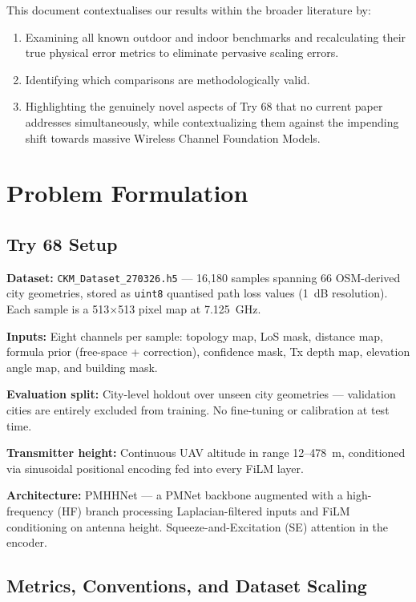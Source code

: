 \documentclass[11pt,a4paper]{article}
\begin{document}
This document contextualises our results within the broader literature by:
\begin{enumerate}[nosep]
    \item Examining all known outdoor and indoor benchmarks and recalculating their true physical error metrics to eliminate pervasive scaling errors.
    \item Identifying which comparisons are methodologically valid.
    \item Highlighting the genuinely novel aspects of Try 68 that no current paper addresses simultaneously, while contextualizing them against the impending shift towards massive Wireless Channel Foundation Models.
\end{enumerate}

\section{Problem Formulation}
\label{sec:problem}

\subsection{Try 68 Setup}

\textbf{Dataset:} \texttt{CKM\_Dataset\_270326.h5} — 16,180 samples spanning 66
OSM-derived city geometries, stored as \texttt{uint8} quantised path loss values (1~dB
resolution). Each sample is a 513$\times$513 pixel map at 7.125~GHz.

\textbf{Inputs:} Eight channels per sample: topology map, LoS mask, distance map,
formula prior (free-space + correction), confidence mask, Tx depth map, elevation
angle map, and building mask.

\textbf{Evaluation split:} City-level holdout over unseen city geometries —
validation cities are entirely excluded from training. No fine-tuning or
calibration at test time.

\textbf{Transmitter height:} Continuous UAV altitude in range 12--478~m, conditioned
via sinusoidal positional encoding fed into every FiLM layer.

\textbf{Architecture:} PMHHNet — a PMNet backbone augmented with a high-frequency
(HF) branch processing Laplacian-filtered inputs and FiLM conditioning on antenna
height. Squeeze-and-Excitation (SE) attention in the encoder.

\subsection{Metrics, Conventions, and Dataset Scaling}
\end{document}
